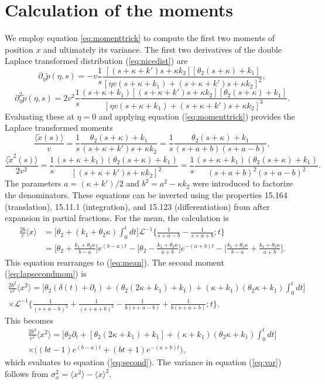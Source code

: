 \documentclass[]{agujournal2018}
\newcommand\be{\begin{equation}}
\newcommand\ee{\end{equation}}
\newcommand\bra{\langle}
\newcommand\ket{\rangle}
\newcommand\tp{\tilde{p}}
\newcommand\El{\mathcal{L}}
\begin{document}
\section{Calculation of the moments}
\label{sec:appendixB}
We employ equation \ref{eq:momenttrick} to compute the first two moments of position $x$ and ultimately its variance. The first two derivatives of the double Laplace transformed distribution (\ref{eq:nicedist}) are
\be \partial_\eta \tp(\eta,s) = -v \frac{1}{s}\frac{[(s+\kappa + k')s + \kappa k_2][\theta_2(s+\kappa) + k_1]}{[\eta v(s+\kappa +k_1) + (s+ \kappa + k')s+\kappa k_2]^2},\ee
\be \partial_\eta^2 \tp(\eta,s) = 2v^2 \frac{1}{s} \frac{(s+\kappa+k_1)[(s+\kappa + k')s+\kappa k_2][\theta_2(s+\kappa) + k_1]}{[\eta v(s+\kappa + k_1) + (s+\kappa + k')s+ \kappa k_2]^3}.\ee
Evaluating these at $\eta=0$ and applying equation (\ref{eq:momenttrick}) provides the Laplace transformed moments
\be  \frac{\bra\tilde{x}(s)\ket} {v} = \frac{1}{s}\frac{\theta_2(s+\kappa)+k_1}{(s+\kappa+k')s+\kappa k_2} = \frac{1}{s} \frac{\theta_2(s+\kappa)+k_1}{(s+a+b)(s+a-b)}\label{eq:lapmean},\ee
\be \frac{\bra \tilde{x}^2(s) \ket}{2v^2} = \frac{1}{s} \frac{(s+\kappa+k_1)(\theta_2(s+\kappa)+k_1)}{[(s+\kappa+k')s+\kappa k_2]^2}=  \frac{1}{s}\frac{(s+\kappa+k_1)(\theta_2(s+\kappa)+k_1)}{(s+a+b)^2(s+a-b)^2}.\label{eq:lapsecondmom}\ee
The parameters $a= (\kappa+k')/2$ and $b^2 = a^2 -\kappa k_2$ were introduced to factorize the denominators.
These equations can be inverted using the properties 15.164 (translation), 15.11.1 (integration), and 15.123 (differentiation) from  \citet{Arfken1985} after expansion in partial fractions.
For the mean, the calculation is
\begin{align}
\frac{2b}{v}\bra x \ket &= \big[\theta_2 + (k_1+\theta_2 \kappa)\int_0^t dt\big]\El^{-1}\Big\{ \frac{1}{s+a-b}-\frac{1}{s+a+b};t\Big\}\\
&= \Big[\theta_2 + \frac{k_1+\theta_2\kappa}{b-a}\Big]e^{(b-a)t} - \Big[\theta_2 - \frac{k_1+\theta_2\kappa}{a+b}\Big]e^{-(a+b)t} - \Big[\frac{k_1+\theta_2\kappa}{b-a} + \frac{k_1+\theta_2\kappa}{a+b}\Big].
\end{align}
This equation rearranges to (\ref{eq:mean}).
The second moment (\ref{eq:lapsecondmom}) is 
\begin{multline}
\frac{2b^2}{v^2}\bra x^2 \ket = \Big[\theta_2(\delta(t) + \partial_t) + (\theta_2(2\kappa + k_1)+k_1) + (\kappa+k_1)(\theta_2\kappa+k_1)\int_0^t dt \Big] \\
\times \El^{-1}\Big\{ \frac{1}{(s+a-b)^2} + \frac{1}{(s+a+b)^2}-\frac{1}{b(s+a-b)}+\frac{1}{b(s+a+b)};t\Big\}.
\end{multline}
This becomes 
\begin{multline}
\frac{2b^3}{v^2}\bra x^2 \ket = \Big[\theta_2\partial_t + [\theta_2(2\kappa+k_1)+k_1] + (\kappa+k_1)(\theta_2\kappa+k_1)\int_0^tdt\Big]\\
\times \Big((bt-1)e^{(b-a)t}+(bt+1)e^{-(a+b)t}\Big),
\end{multline}
which evaluates to equation (\ref{eq:second}).
The variance in equation (\ref{eq:var}) follows from $\sigma_x^2 = \bra x^2 \ket - \bra x \ket^2.$
\end{document}

